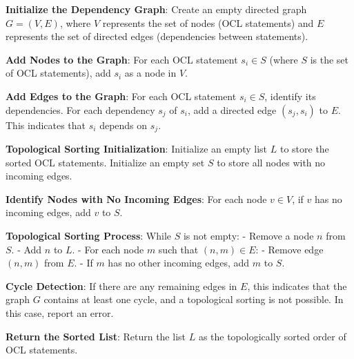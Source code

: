 \documentclass[pdflatex,sn-mathphys-num]{sn-jnl}%
\theoremstyle{thmstyleone}%
\theoremstyle{thmstyletwo}%
\theoremstyle{thmstylethree}%
\begin{document}
\textbf{Initialize the Dependency Graph}: Create an empty directed graph $G = (V, E)$, where $V$ represents the set of nodes (OCL statements) and $E$ represents the set of directed edges (dependencies between statements).

\textbf{Add Nodes to the Graph}: For each OCL statement $s_i \in S$ (where $S$ is the set of OCL statements), add $s_i$ as a node in $V$.

\textbf{Add Edges to the Graph}: For each OCL statement $s_i \in S$, identify its dependencies. For each dependency $s_j$ of $s_i$, add a directed edge $(s_j, s_i)$ to $E$. This indicates that $s_i$ depends on $s_j$.

\textbf{Topological Sorting Initialization}: Initialize an empty list $L$ to store the sorted OCL statements. Initialize an empty set $S$ to store all nodes with no incoming edges.

\textbf{Identify Nodes with No Incoming Edges}: For each node $v \in V$, if $v$ has no incoming edges, add $v$ to $S$.

\textbf{Topological Sorting Process}: While $S$ is not empty:
- Remove a node $n$ from $S$.
- Add $n$ to $L$.
- For each node $m$ such that $(n, m) \in E$:
  - Remove edge $(n, m)$ from $E$.
  - If $m$ has no other incoming edges, add $m$ to $S$.

\textbf{Cycle Detection}: If there are any remaining edges in $E$, this indicates that the graph $G$ contains at least one cycle, and a topological sorting is not possible. In this case, report an error.

\textbf{Return the Sorted List}: Return the list $L$ as the topologically sorted order of OCL statements.
    
    
\end{document}
